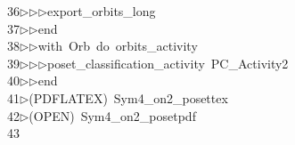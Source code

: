 \begin{tabbing}
36\>$\triangleright$\>$\triangleright$\>$\triangleright$\>export\_orbits\_long\ \\[0pt]
37\>$\triangleright$\>$\triangleright$\>end\ \\[0pt]
38\>$\triangleright$\>$\triangleright$\>with\ Orb\ do\ orbits\_activity\ \\[0pt]
39\>$\triangleright$\>$\triangleright$\>$\triangleright$\>poset\_classification\_activity\ PC\_Activity2\ \\[0pt]
40\>$\triangleright$\>$\triangleright$\>end\\[0pt]
41\>$\triangleright$\>(PDFLATEX)\ Sym4\_on2\_posettex\\[0pt]
42\>$\triangleright$\>(OPEN)\ Sym4\_on2\_posetpdf\\[0pt]
43\>\end{tabbing}
